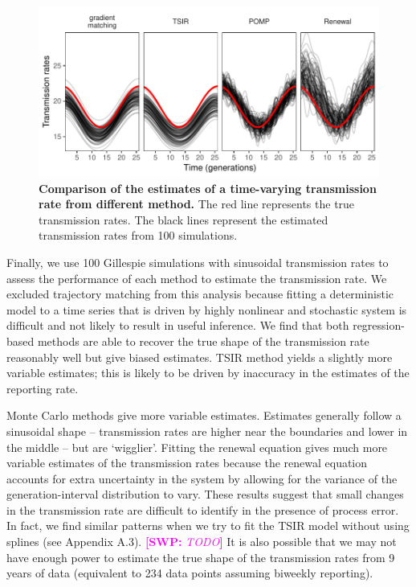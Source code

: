 \documentclass{article}
\newcommand{\comment}[3]{\textcolor{#1}{\textbf{[#2: }\textsl{#3}\textbf{]}}}
\newcommand{\swp}[1]{\comment{magenta}{SWP}{#1}}
\begin{document}
\begin{figure}[!t]
\includegraphics[width=\textwidth]{../figure/compare_transmission.pdf}
\caption{
\textbf{Comparison of the estimates of a time-varying transmission rate from different method.}
The red line represents the true transmission rates.
The black lines represent the estimated transmission rates from 100 simulations.
}
\end{figure}
 
Finally, we use 100 Gillespie simulations with sinusoidal transmission rates to assess the performance of each method to estimate the transmission rate.
We excluded trajectory matching from this analysis because fitting a deterministic model to a time series that is driven by highly nonlinear and stochastic system is difficult and not likely to result in useful inference.
We find that both regression-based methods are able to recover the true shape of the transmission rate reasonably well but give biased estimates.
TSIR method yields a slightly more variable estimates; this is likely to be driven by inaccuracy in the estimates of the reporting rate. 

Monte Carlo methods give more variable estimates.
Estimates generally follow a sinusoidal shape -- transmission rates are higher near the boundaries and lower in the middle -- but are `wigglier'.
Fitting the renewal equation gives much more variable estimates of the transmission rates because the renewal equation accounts for extra uncertainty in the system by allowing for the variance of the generation-interval distribution to vary.
These results suggest that small changes in the transmission rate are difficult to identify in the presence of process error.
In fact, we find similar patterns when we try to fit the TSIR model without using splines (see Appendix A.3). \swp{TODO}
It is also possible that we may not have enough power to estimate the true shape of the transmission rates from 9 years of data (equivalent to 234 data points assuming biweekly reporting).
\end{document}
